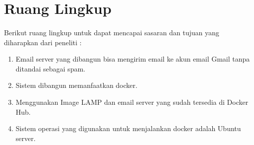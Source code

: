 \documentclass[./bab_1.tex]{subfiles}
\begin{document}
\section{Ruang Lingkup}
  \paragraph*{} Berikut ruang lingkup untuk dapat mencapai sasaran dan tujuan yang diharapkan dari peneliti :
    \begin{enumerate}
      \item Email server yang dibangun bisa mengirim email
        ke akun email Gmail tanpa ditandai sebagai spam.
      \item Sistem dibangun memanfaatkan docker.
      \item Menggunakan Image LAMP dan email server yang
        sudah tersedia di Docker Hub.
      \item Sistem operasi yang digunakan untuk menjalankan
        docker adalah Ubuntu server.
    \end{enumerate}
\end{document}
